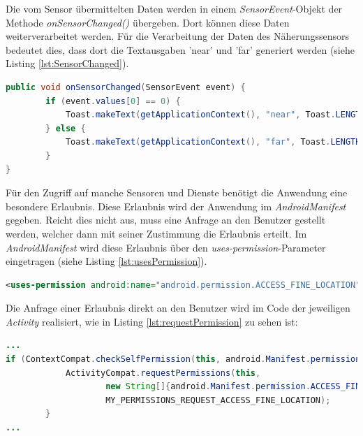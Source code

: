 Die vom Sensor übermittelten Daten werden in einem \textit{SensorEvent}-Objekt der Methode \textit{onSensorChanged()} übergeben. Dort können diese Daten weiterverarbeitet werden. Für die Verarbeitung der Daten des Näherungssensors bedeutet dies, dass dort die Textausgaben 'near' und 'far' generiert werden (siehe Listing \ref{lst:SensorChanged}). 

\begin{lstlisting}[caption=Die Methode \textit{onSensorChanged()}, label=lst:SensorChanged, language=Java]
public void onSensorChanged(SensorEvent event) {
        if (event.values[0] == 0) {
            Toast.makeText(getApplicationContext(), "near", Toast.LENGTH_SHORT).show();
        } else {
            Toast.makeText(getApplicationContext(), "far", Toast.LENGTH_SHORT).show();
        }
}
\end{lstlisting} 

Für den Zugriff auf manche Sensoren und Dienste benötigt die Anwendung eine besondere Erlaubnis. Diese Erlaubnis wird der Anwendung im \textit{AndroidManifest} gegeben. Reicht dies nicht aus, muss eine Anfrage an den Benutzer gestellt werden, welcher dann mit seiner Zustimmung die Erlaubnis erteilt. Im \textit{AndroidManifest} wird diese Erlaubnis über den \textit{uses-permission}-Parameter eingetragen (siehe Listing \ref{lst:usesPermission}).

\begin{lstlisting}[caption=Erlaubnis für die Nutzung eines Dienstes im \textit{AndroidManifest}, label=lst:usesPermission, language=XML]
<uses-permission android:name="android.permission.ACCESS_FINE_LOCATION" />
\end{lstlisting}  

Die Anfrage einer Erlaubnis direkt an den Benutzer wird im Code der jeweiligen \textit{Activity} realisiert, wie in Listing \ref{lst:requestPermission} zu sehen ist:
\clearpage

\begin{lstlisting}[caption=Generierung der Anfrage für die Erlaubnis einen Dienst zu nutzen an den Benutzer, label=lst:requestPermission, language=Java]
...
if (ContextCompat.checkSelfPermission(this, android.Manifest.permission.ACCESS_FINE_LOCATION) != PackageManager.PERMISSION_GRANTED) {
            ActivityCompat.requestPermissions(this,
                    new String[]{android.Manifest.permission.ACCESS_FINE_LOCATION},
                    MY_PERMISSIONS_REQUEST_ACCESS_FINE_LOCATION);
        }
...
\end{lstlisting} 

